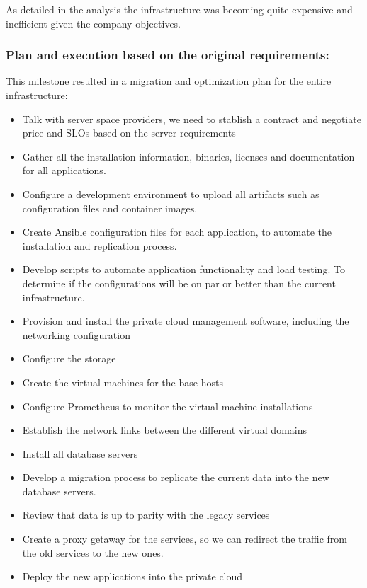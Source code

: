 \documentclass{llncs}
\begin{document}
As detailed in the analysis the infrastructure was becoming quite expensive and inefficient given the company objectives.

\subsubsection*{Plan and execution based on the original requirements:}

This milestone resulted in a migration and optimization plan for the entire infrastructure:
\begin{itemize}

    \item  Talk with server space providers, we need to stablish a contract and negotiate price and SLOs based on the server requirements
    \item Gather all the installation information, binaries, licenses and documentation for all applications.
    \item Configure a development environment to upload all artifacts such as configuration files and container images.
    \item Create Ansible configuration files for each application, to automate the installation and replication process.
    \item Develop scripts to automate application functionality and load testing. To determine if the configurations will be on par or better than the current infrastructure.
    \item Provision and install the private cloud management software, including the networking configuration
    \item Configure the storage
    \item Create the virtual machines for the base hosts
    \item Configure Prometheus to monitor the virtual machine installations
    \item Establish the network links between the different virtual domains
    \item Install all database servers
    \item Develop a migration process to replicate the current data into the new database servers.
    \item Review that data is up to parity with the legacy services
    \item Create a proxy getaway for the services, so we can redirect the traffic from the old services to the new ones.
    \item Deploy the new applications into the private cloud

\end{itemize}
\end{document}

